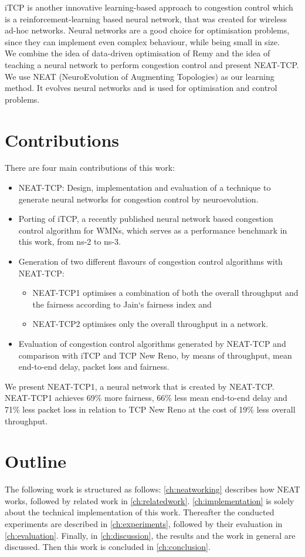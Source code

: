 iTCP \cite{iTCP} is another innovative learning-based approach to congestion control which is a reinforcement-learning based neural network, that was created for wireless ad-hoc networks. Neural networks are a good choice for optimisation problems, since they can implement even complex behaviour, while being small in size.\\
We combine the idea of data-driven optimisation of Remy and the idea of teaching a neural network to perform congestion control and present NEAT-TCP. We use NEAT (NeuroEvolution of Augmenting Topologies) \cite{neat} as our learning method. It evolves neural networks and is used for optimisation and control problems.

\section{Contributions}\label{sec:contribution}
There are four main contributions of this work:
\begin{itemize}
	\item NEAT-TCP: Design, implementation and evaluation of a technique to generate neural networks for congestion control by neuroevolution. 
	\item Porting of iTCP, a recently published neural network based congestion control algorithm for WMNs, which serves as a performance benchmark in this work, from ns-2 to ns-3.
	\item Generation of two different flavours of congestion control algorithms with NEAT-TCP: 
	\begin{itemize}
	\item NEAT-TCP1 optimises a combination of both the overall throughput and the fairness according to Jain`s 			fairness index and
	\item NEAT-TCP2 optimises only the overall throughput in a network.
	\end{itemize}	
	\item Evaluation of congestion control algorithms generated by NEAT-TCP and comparison with iTCP and TCP New Reno, by means of throughput, mean end-to-end delay, packet loss and fairness.
\end{itemize}
We present NEAT-TCP1, a neural network that is created by NEAT-TCP. NEAT-TCP1 achieves 69\% more fairness, 66\% less mean end-to-end delay and 71\% less packet loss in relation to TCP New Reno at the cost of 19\% less overall throughput.
\section{Outline}\label{sec:outline}
The following work is structured as follows: \autoref{ch:neatworking} describes how NEAT works, followed by related work in \autoref{ch:relatedwork}.  \autoref{ch:implementation} is solely about the technical implementation of this work. Thereafter the conducted experiments are described in \autoref{ch:experiments}, followed by their evaluation in \autoref{ch:evaluation}. Finally, in \autoref{ch:discussion}, the results and the work in general are discussed. Then this work is concluded in \autoref{ch:conclusion}.
